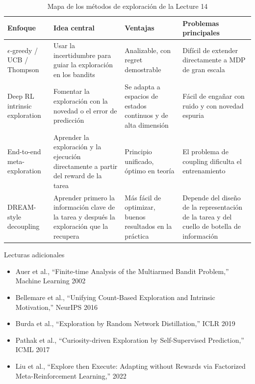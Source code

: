 \documentclass[a4paper]{article}
\begin{document}
\begin{table}[H]
\centering
\begin{tabular}{p{} p{} p{} p{}}
\toprule
Enfoque & Idea central & Ventajas & Problemas principales \\
\midrule
$\epsilon$-greedy / UCB / Thompson & Usar la incertidumbre para guiar la exploración en los bandits & Analizable, con regret demostrable & Difícil de extender directamente a MDP de gran escala \\
Deep RL intrinsic exploration & Fomentar la exploración con la novedad o el error de predicción & Se adapta a espacios de estados continuos y de alta dimensión & Fácil de engañar con ruido y con novedad espuria \\
End-to-end meta-exploration & Aprender la exploración y la ejecución directamente a partir del reward de la tarea & Principio unificado, óptimo en teoría & El problema de coupling dificulta el entrenamiento \\
DREAM-style decoupling & Aprender primero la información clave de la tarea y después la exploración que la recupera & Más fácil de optimizar, buenos resultados en la práctica & Depende del diseño de la representación de la tarea y del cuello de botella de información \\
\bottomrule
\end{tabular}
\caption{Mapa de los métodos de exploración de la Lecture 14}
\end{table}

\begin{knowledgebox}{Lecturas adicionales}
\begin{itemize}
    \item Auer et al., ``Finite-time Analysis of the Multiarmed Bandit Problem,'' Machine Learning 2002
    \item Bellemare et al., ``Unifying Count-Based Exploration and Intrinsic Motivation,'' NeurIPS 2016
    \item Burda et al., ``Exploration by Random Network Distillation,'' ICLR 2019
    \item Pathak et al., ``Curiosity-driven Exploration by Self-Supervised Prediction,'' ICML 2017
    \item Liu et al., ``Explore then Execute: Adapting without Rewards via Factorized Meta-Reinforcement Learning,'' 2022
\end{itemize}
\end{knowledgebox}
\end{document}
